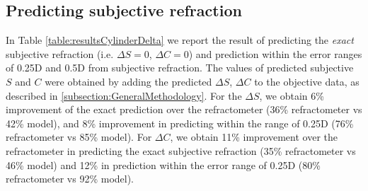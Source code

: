 \documentclass[article,twocolumn,preprint,10pt]{paper}%
\renewcommand{\(}{\left(}
\renewcommand{\)}{\right)}
\renewcommand{\[}{\left[}
\renewcommand{\]}{\right]}
\newcommand{\1}{\mbox{\boldmath$1$}}
\begin{document}
	\subsection{Predicting subjective refraction}\label{subsection:PredictingSubjectiveRefraction}
	 In Table \ref{table:resultsCylinderDelta} we report the result of predicting the \textit{exact} subjective refraction (i.e. $\Delta S=0$, $\Delta C=0$) and prediction within the error ranges of 0.25D and 0.5D from subjective refraction. The values of predicted subjective $S$ and $C$ were obtained by adding the predicted $\Delta S$, $\Delta C$ to the objective data, as described in \ref{subsection:GeneralMethodology}. For the $\Delta S$, we obtain 6\% improvement of the exact prediction over the refractometer (36\% refractometer vs 42\% model), and 8\% improvement in predicting within the range of 0.25D (76\% refractometer vs 85\% model).  For $\Delta C$, we obtain 11\% improvement over the refractometer in predicting the exact subjective refraction (35\% refractometer vs 46\% model) and 12\% in prediction within the error range of 0.25D (80\% refractometer vs 92\% model). 
		
\end{document}
